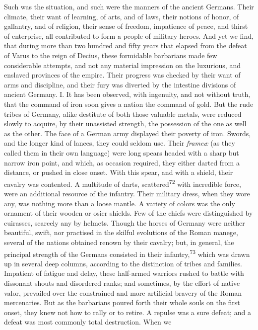 Such was the situation, and such were the manners of the ancient
Germans. Their climate, their want of learning, of arts, and of
laws, their notions of honor, of gallantry, and of religion,
their sense of freedom, impatience of peace, and thirst of
enterprise, all contributed to form a people of military heroes.
And yet we find, that during more than two hundred and fifty
years that elapsed from the defeat of Varus to the reign of
Decius, these formidable barbarians made few considerable
attempts, and not any material impression on the luxurious, and
enslaved provinces of the empire. Their progress was checked by
their want of arms and discipline, and their fury was diverted by
the intestine divisions of ancient Germany. I. It has been
observed, with ingenuity, and not without truth, that the command
of iron soon gives a nation the command of gold. But the rude
tribes of Germany, alike destitute of both those valuable metals,
were reduced slowly to acquire, by their unassisted strength, the
possession of the one as well as the other. The face of a German
army displayed their poverty of iron. Swords, and the longer kind
of lances, they could seldom use. Their \textit{frameæ} (as they called
them in their own language) were long spears headed with a sharp
but narrow iron point, and which, as occasion required, they
either darted from a distance, or pushed in close onset. With
this spear, and with a shield, their cavalry was contented. A
multitude of darts, scattered\textsuperscript{72} with incredible force, were an
additional resource of the infantry. Their military dress, when
they wore any, was nothing more than a loose mantle. A variety of
colors was the only ornament of their wooden or osier shields.
Few of the chiefs were distinguished by cuirasses, scarcely any
by helmets. Though the horses of Germany were neither beautiful,
swift, nor practised in the skilful evolutions of the Roman
manege, several of the nations obtained renown by their cavalry;
but, in general, the principal strength of the Germans consisted
in their infantry,\textsuperscript{73} which was drawn up in several deep columns,
according to the distinction of tribes and families. Impatient of
fatigue and delay, these half-armed warriors rushed to battle
with dissonant shouts and disordered ranks; and sometimes, by the
effort of native valor, prevailed over the constrained and more
artificial bravery of the Roman mercenaries. But as the
barbarians poured forth their whole souls on the first onset,
they knew not how to rally or to retire. A repulse was a sure
defeat; and a defeat was most commonly total destruction. When we
